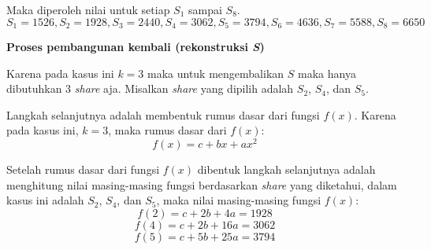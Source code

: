 Maka diperoleh nilai untuk setiap \begin{math}S_1\end{math} sampai \begin{math}S_8\end{math}.
\begin{displaymath}
	S_1 = 1526, S_2 = 1928, S_3 = 2440, S_4 = 3062, S_5 = 3794, S_6 = 4636, S_7 = 5588, S_8 = 6650
\end{displaymath}

\begin{flushleft}
	\textbf{Proses pembangunan kembali (rekonstruksi \textit{S})}
\end{flushleft}

Karena pada kasus ini \begin{math}k=3\end{math} maka untuk mengembalikan \begin{math}S\end{math} maka hanya dibutuhkan 3 \textit{share} aja. Misalkan \textit{share} yang dipilih adalah \begin{math}S_2\end{math}, \begin{math}S_4\end{math}, dan \begin{math}S_5\end{math}.

Langkah selanjutnya adalah membentuk rumus dasar dari fungsi \begin{math}f(x)\end{math}. Karena pada kasus ini, \begin{math}k=3\end{math}, maka rumus dasar dari \begin{math}f(x)\end{math}:
\begin{displaymath}
	f(x) = c + bx + ax^2
\end{displaymath}

Setelah rumus dasar dari fungsi \begin{math}f(x)\end{math} dibentuk langkah selanjutnya adalah menghitung nilai masing-masing fungsi berdasarkan \textit{share} yang diketahui, dalam kasus ini adalah \begin{math}S_2\end{math}, \begin{math}S_4\end{math}, dan \begin{math}S_5\end{math}, maka nilai masing-masing fungsi \begin{math}f(x)\end{math}:
\begin{displaymath}
	f(2) = c + 2b + 4a = 1928
\end{displaymath}
\begin{displaymath}
	f(4) = c + 2b + 16a = 3062
\end{displaymath}
\begin{displaymath}
	f(5) = c + 5b + 25a = 3794
\end{displaymath}

